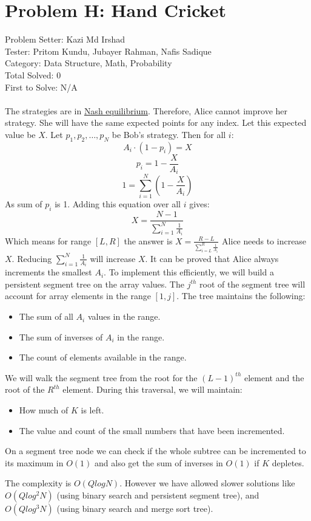 \section*{Problem H: Hand Cricket}
Problem Setter: Kazi Md Irshad \\
Tester: Pritom Kundu, Jubayer Rahman, Nafis Sadique \\
Category: Data Structure, Math, Probability \\
Total Solved: 0 \\
First to Solve: N/A \\
\\
The strategies are in \href{https://en.wikipedia.org/wiki/Nash_equilibrium}{Nash equilibrium}. Therefore, Alice cannot improve her strategy. She will have the same expected points for any index. Let this expected value be $X$. Let $p_1, p_2, \dots, p_N$ be Bob's strategy. Then for all $i$:
$$ A_i \cdot (1 - p_i) = X $$
$$p_i = 1 - \frac{X}{A_i}$$
$$1 = \sum_{i=1}^N(1-\frac{X}{A_i})$$
As sum of $p_i$ is 1. Adding this equation over all $i$ gives:
$$ X = \frac{N - 1}{\sum_{i=1}^N \frac{1}{A_i}}$$ 
Which means for range $[L,R]$ the answer is $X = \frac{R-L}{\sum_{i=L}^R \frac{1}{A_i}}$
Alice needs to increase $X$. Reducing $\sum_{i=1}^N \frac{1}{A_i}$ will increase $X$. It can be proved that Alice always increments the smallest $A_i$. To implement this efficiently, we will build a persistent segment tree on the array values. The $j^{th}$ root of the segment tree will account for array elements in the range $[1, j]$. The tree maintains the following:
\begin{itemize}
    \item The sum of all $A_i$ values in the range.
    \item The sum of inverses of $A_i$ in the range.
    \item The count of elements available in the range.
\end{itemize}
We will walk the segment tree from the root for the $(L-1)^{th}$ element and the root of the $R^{th}$ element. During this traversal, we will maintain:
\begin{itemize}
    \item How much of $K$ is left.
    \item The value and count of the small numbers that have been incremented.
\end{itemize}
On a segment tree node we can check if the whole subtree can be incremented to its maximum in $O(1)$ and also get the sum of inverses in $O(1)$ if $K$ depletes.

The complexity is $O(QlogN)$. However we have allowed slower solutions like $O(Qlog^2N)$ (using binary search and persistent segment tree), and $O(Qlog^3N)$ (using binary search and merge sort tree).
